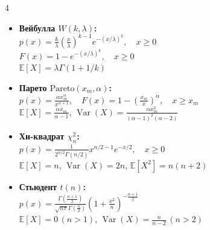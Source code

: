 \documentclass[a4paper, landscape]{article}
\newcommand{\E}{\mathbb{E}}
\DeclareMathOperator{\Var}{Var}
\begin{document}
\begin{multicols*}{4}
\begin{itemize}[leftmargin=*, nosep, itemsep=5pt]
    \item \textbf{Вейбулла $W(k, \lambda)$:} \\
    $p(x) = \frac{k}{\lambda} \left(\frac{x}{\lambda}\right)^{k-1} e^{-(x/\lambda)^k}, \quad x \ge 0$ \\
    $F(x) = 1 - e^{-(x/\lambda)^k}, \quad x \ge 0$ \\
    $\E[X] = \lambda \Gamma(1+1/k)$

    \item \textbf{Парето $\text{Pareto}(x_m, \alpha)$:} \\
    $p(x) = \frac{\alpha x_m^\alpha}{x^{\alpha+1}}, \quad F(x) = 1 - \left(\frac{x_m}{x}\right)^\alpha, \quad x \ge x_m$ \\
    $\E[X] = \frac{\alpha x_m}{\alpha-1}$, \quad $\Var(X) = \frac{\alpha x_m^2}{(\alpha-1)^2(\alpha-2)}$

    \item \textbf{Хи-квадрат $\chi^2_n$:} \\
    $p(x) = \frac{1}{2^{n/2}\Gamma(n/2)} x^{n/2-1} e^{-x/2}, \quad x \ge 0$ \\
    $\E[X] = n$, \quad $\Var(X) = 2n$, \quad $\E[X^2] = n(n+2)$

    \item \textbf{Стьюдент $t(n)$:} \\
    $p(x) = \frac{\Gamma(\frac{n+1}{2})}{\sqrt{n\pi}\Gamma(\frac{n}{2})} \left(1 + \frac{x^2}{n}\right)^{-\frac{n+1}{2}}$ \\
    $\E[X] = 0 \, (n>1)$, \quad $\Var(X) = \frac{n}{n-2} \, (n>2)$
\end{itemize}
\end{multicols*}
\end{document}

